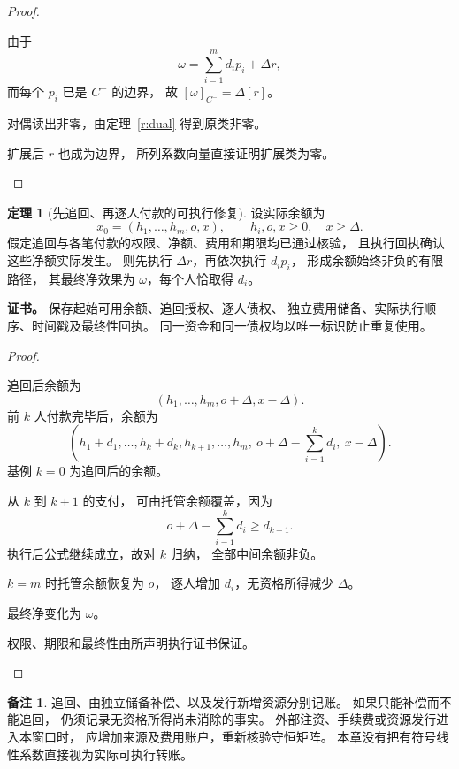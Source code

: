 \documentclass[UTF8,12pt,a4paper,openany,fontset=none,zihao=false]{ctexrep}
\theoremstyle{definition}
\newtheorem{theorem}{定理}[chapter]
\newtheorem{remark}{备注}[chapter]
\newenvironment{certificate}{\par\noindent\textbf{证书。}\ignorespaces}{\par}
\newcommand{\1}{\mathbf 1}
\begin{document}
\begin{proof}
\begin{semanticsteps}
\item 由于
\[
\omega=\sum_{i=1}^m d_ip_i+\Delta r,
\]
而每个 \(p_i\) 已是 \(C^-\) 的边界，
故 \([\omega]_{C^-}=\Delta[r]\)。
\item 对偶读出非零，由定理~\ref{r:dual} 得到原类非零。
\item 扩展后 \(r\) 也成为边界，
所列系数向量直接证明扩展类为零。
\end{semanticsteps}
\end{proof}
\begin{theorem}[先追回、再逐人付款的可执行修复]
\label{r:constructive}
设实际余额为
\[
x_0=(h_1,\ldots,h_m,o,x),\qquad
h_i,o,x\ge0,\quad x\ge\Delta.
\]
假定追回与各笔付款的权限、净额、费用和期限均已通过核验，
且执行回执确认这些净额实际发生。
则先执行 \(\Delta r\)，再依次执行 \(d_ip_i\)，
形成余额始终非负的有限路径，
其最终净效果为 \(\omega\)，每个人恰取得 \(d_i\)。
\end{theorem}
\begin{certificate}
保存起始可用余额、追回授权、逐人债权、
独立费用储备、实际执行顺序、时间戳及最终性回执。
同一资金和同一债权均以唯一标识防止重复使用。
\end{certificate}
\begin{proof}
\begin{semanticsteps}
\item 追回后余额为
\[
(h_1,\ldots,h_m,o+\Delta,x-\Delta).
\]
前 \(k\) 人付款完毕后，余额为
\[
\left(
h_1+d_1,\ldots,h_k+d_k,
h_{k+1},\ldots,h_m,\
o+\Delta-\sum_{i=1}^k d_i,\
x-\Delta
\right).
\]
基例 \(k=0\) 为追回后的余额。
\item 从 \(k\) 到 \(k+1\) 的支付，
可由托管余额覆盖，因为
\[
o+\Delta-\sum_{i=1}^k d_i
\ge d_{k+1}.
\]
执行后公式继续成立，故对 \(k\) 归纳，
全部中间余额非负。
\item \(k=m\) 时托管余额恢复为 \(o\)，
逐人增加 \(d_i\)，无资格所得减少 \(\Delta\)。
\item 最终净变化为 \(\omega\)。
\item 权限、期限和最终性由所声明执行证书保证。
\end{semanticsteps}
\end{proof}
\begin{remark}
追回、由独立储备补偿、以及发行新增资源分别记账。
如果只能补偿而不能追回，
仍须记录无资格所得尚未消除的事实。
外部注资、手续费或资源发行进入本窗口时，
应增加来源及费用账户，重新核验守恒矩阵。
本章没有把有符号线性系数直接视为实际可执行转账。
\end{remark}
\end{document}
